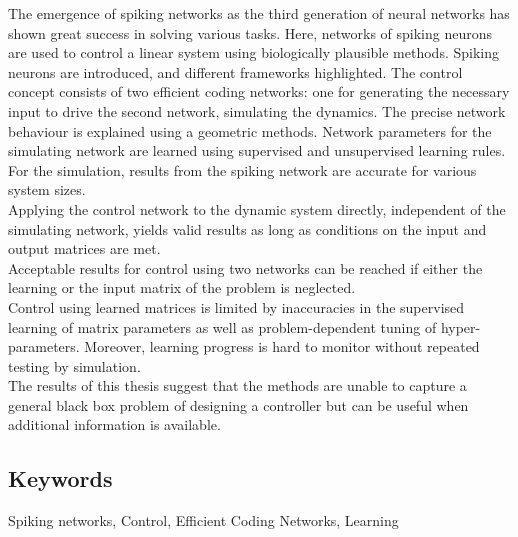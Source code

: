 
The emergence of spiking networks as the third generation of neural networks has shown great success in solving various tasks. Here, networks of spiking neurons are used to control a linear system using biologically plausible methods. Spiking neurons are introduced, and different frameworks highlighted. The control concept consists of two efficient coding networks: one for generating the necessary input to drive the second network, simulating the dynamics. The precise network behaviour is explained using a geometric methods. Network parameters for the simulating network are learned using supervised and unsupervised learning rules.\\
For the simulation, results from the spiking network are accurate for various system sizes.\\
Applying the control network to the dynamic system directly, independent of the simulating network, yields valid results as long as conditions on the input and output matrices are met.\\
Acceptable results for control using two networks can be reached if either the learning or the input matrix of the problem is neglected.\\
Control using learned matrices is limited by inaccuracies in the supervised learning of matrix parameters as well as problem-dependent tuning of hyper-parameters. Moreover, learning progress is hard to monitor without repeated testing by simulation.\\
The results of this thesis suggest that the methods are unable to capture a general black box problem of designing a controller but can be useful when additional information is available.


\subsection*{Keywords}
Spiking networks, Control, Efficient Coding Networks, Learning



\newpage
\thispagestyle{plain}
